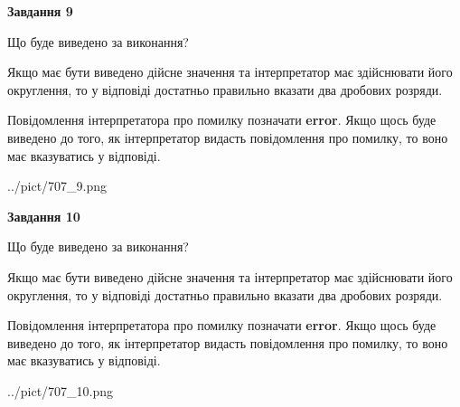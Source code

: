 \documentclass[12pt, ukrainian]{article}
\begin{document}
{\begin {Large}
{\begin {center}\textbf{Завдання 9}\end {center}}\par
Що буде виведено за виконання? \par

Якщо має бути виведено дійсне значення та інтерпретатор має здійснювати його округлення, 
то у відповіді достатньо правильно вказати два дробових розряди.

Повідомлення інтерпретатора про помилку позначати \textbf{error}.
Якщо щось буде виведено до того, як інтерпретатор видасть повідомлення про помилку, 
то воно має вказуватись у відповіді. \par

\begin{center}
	{../pict/707_9.png}
\end{center}
\newpage

{\begin {center}\textbf{Завдання 10}\end {center}}\par
Що буде виведено за виконання? \par

Якщо має бути виведено дійсне значення та інтерпретатор має здійснювати його округлення, 
то у відповіді достатньо правильно вказати два дробових розряди.

Повідомлення інтерпретатора про помилку позначати \textbf{error}.
Якщо щось буде виведено до того, як інтерпретатор видасть повідомлення про помилку, 
то воно має вказуватись у відповіді. \par

\begin{center}
	{../pict/707_10.png}
\end{center}
\newpage

\end {Large}}
\end{document}
